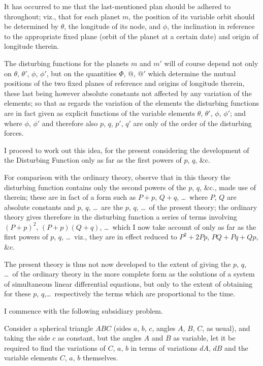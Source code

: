 \documentclass[11pt,a4paper]{article}
\theoremstyle{plain}
\theoremstyle{definition}
\theoremstyle{remark}
\begin{document}
It has occurred to me that the last-mentioned plan should be adhered to throughout; viz., that for each planet $m$, the position of its variable orbit should be determined by $\theta$, the longitude of its node, and $\phi$, the inclination in reference to the appropriate fixed plane (orbit of the planet at a certain date) and origin of longitude therein.

The disturbing functions for the planets $m$ and $m'$ will of course depend not only on $\theta$, $\theta'$, $\phi$, $\phi'$, but on the quantities $\Phi$, $@$, $@'$ which determine the mutual positions of the two fixed planes of reference and origins of longitude therein, these last being however absolute constants not affected by any variation of the elements; so that as regards the variation of the elements the disturbing functions are in fact given as explicit functions of the variable elements $\theta$, $\theta'$, $\phi$, $\phi'$; and where $\phi$, $\phi'$ and therefore also $p$, $q$, $p'$, $q'$ are only of the order of the disturbing forces.

I proceed to work out this idea, for the present considering the development of the Disturbing Function only as far as the first powers of $p$, $q$, \&c.

For comparison with the ordinary theory, observe that in this theory the disturbing function contains only the second powers of the $p$, $q$, \&c., made use of therein; these are in fact of a form such as $P+p$, $Q+q$, \dots\ where $P$, $Q$ are absolute constants and $p$, $q$, \dots\ are the $p$, $q$, \dots\ of the present theory; the ordinary theory gives therefore in the disturbing function a series of terms involving $(P+p)^{2}$, $(P+p)(Q+q)$, \dots\ which I now take account of only as far as the first powers of $p$, $q$, \dots\ viz., they are in effect reduced to $P^{2}+2Pp$, $PQ+Pq+Qp$, \&c.

The present theory is thus not now developed to the extent of giving the $p$, $q$, \dots\ of the ordinary theory in the more complete form as the solutions of a system of simultaneous linear differential equations, but only to the extent of obtaining for these $p$, $q$,\dots\ respectively the terms which are proportional to the time.

I commence with the following subsidiary problem.

Consider a spherical triangle $ABC$ (sides $a$, $b$, $c$, angles $A$, $B$, $C$, as usual), and taking the side $c$ as constant, but the angles $A$ and $B$ as variable, let it be required to find the variations of $C$, $a$, $b$ in terms of variations $dA$, $dB$ and the variable elements $C$, $a$, $b$ themselves.
\end{document}
